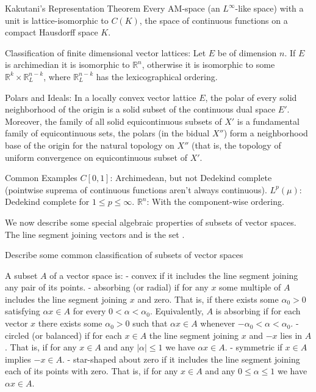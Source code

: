 Kakutani’s Representation Theorem
Every AM-space (an \( L^\infty \)-like space) with a unit is lattice-isomorphic to \( C(K) \), the space of continuous functions on a compact Hausdorff space \( K \).

Classification of finite dimensional vector lattices:
Let \( E \) be of dimension \( n \). If \( E \) is archimedian it is isomorphic to \( \mathbb{R}^n \), otherwise
it is isomorphic to some \( \mathbb{R}^k \times \mathbb{R}^{n-k}_L \), where \( \mathbb{R}^{n-k}_L \) has the lexicographical ordering.

Polars and Ideals:
In a locally convex vector lattice \( E \), the polar of every solid neighborhood of the origin is a solid subset of the continuous dual space 
\( E' \). Moreover, the family of all solid equicontinuous subsets of \( X' \) is a fundamental family of equicontinuous sets, 
the polars (in the bidual \( X'' \)) form a neighborhood base of the origin for the natural topology on \( X'' \)
(that is, the topology of uniform convergence on equicontinuous subset of \( X' \).

Common Examples
\( C[0,1] \): Archimedean, but not Dedekind complete (pointwise suprema of continuous functions aren't always continuous).
\( L^p(\mu) \): Dedekind complete for \( 1 \leq p \leq \infty \).
\( \mathbb{R}^n \): With the component-wise ordering.



We now describe some special algebraic properties of subsets of vector spaces. The line segment joining vectors  and  is the set .

Describe some common classification of subsets of vector spaces

A subset \(A\) of a vector space is:
- convex if it includes the line segment joining any pair of its points.
- absorbing (or radial) if for any \(x\) some multiple of \(A\) includes the line segment joining \(x\) and zero.
    That is, if there exists some \(\alpha_0 > 0\) satisfying \(\alpha x \in A\) for every \(0 < \alpha < \alpha_0\).
    Equivalently, \(A\) is absorbing if for each vector \(x\) there exists some \(\alpha_0 > 0\) such that \(\alpha x \in A\) whenever \(-\alpha_0 < \alpha < \alpha_0\).
- circled (or balanced) if for each \(x \in A\) the line segment joining \(x\) and \(-x\) lies in \(A\).
    That is, if for any \(x \in A\) and any \(|\alpha| \leq 1\) we have \(\alpha x \in A\).
- symmetric if \(x \in A\) implies \(-x \in A\).
- star-shaped about zero if it includes the line segment joining each of its points with zero.
    That is, if for any \(x \in A\) and any \(0 \leq \alpha \leq 1\) we have \(\alpha x \in A\).



